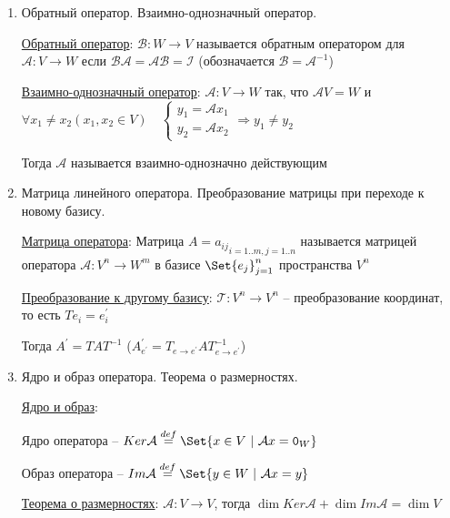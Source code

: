 \documentclass[12pt]{article}
\begin{document}
\begin{enumerate}
        4* $\mathcal{A} (\mathcal{B}\mathcal{C}) = (\mathcal{A}\mathcal{B}) \mathcal{C}$


        \item Обратный оператор. Взаимно-однозначный оператор.

        \hyperlink{reverselinearoperator}{Обратный оператор}: $\mathcal{B} : W \rightarrow V$ называется обратным оператором для $\mathcal{A} : V \rightarrow W$
        если $\mathcal{B}\mathcal{A} = \mathcal{A}\mathcal{B} = \mathcal{I}$ (обозначается $\mathcal{B} = \mathcal{A}^{-1}$)

        \hyperlink{onetoonelinearoperator}{Взаимно-однозначный оператор}: $\mathcal{A} : V \rightarrow W$ так, что $\mathcal{A}V = W$ и $\forall x_1 \neq x_2 (x_1, x_2 \in V) \quad
        \begin{cases}y_1 = \mathcal{A}x_1 \\ y_2 = \mathcal{A}x_2\end{cases} \Longrightarrow y_1 \neq y_2$

        Тогда $\mathcal{A}$ называется взаимно-однозначно действующим

        \item Матрица линейного оператора. Преобразование матрицы при переходе к новому базису.

        \hyperlink{operatorsmatrix}{Матрица оператора}: Матрица $A = {a_{ij}}_{i=1..m, j=1..n}$ называется матрицей оператора $\mathcal{A} : V^n \rightarrow W^m$ в базисе $\Set{e_j}^n_{j=1}$ пространства $V^n$

        \hyperlink{transformationtodifferentbasis}{Преобразование к другому базису}:     $\mathcal{T} : V^n \rightarrow V^n$ -- преобразование координат, то есть $Te_i = e^\prime_i$

        Тогда $A^\prime = TAT^{-1}$ ($A^\prime_{e^\prime} = T_{e\to e^\prime}AT^{-1}_{e\to e^\prime}$)

        \item Ядро и образ оператора. Теорема о размерностях.

        \hyperlink{kernalandimageofoperator}{Ядро и образ}:

        Ядро оператора -- $Ker \mathcal{A} \stackrel{def}{=} \Set{x \in V \ | \ \mathcal{A}x = \texttt{0}_W}$

        Образ оператора -- $Im \mathcal{A} \stackrel{def}{=} \Set{y \in W \ | \ \mathcal{A}x = y}$

        \hyperlink{theoremaboutdimensions}{Теорема о размерностях}: $\mathcal{A} : V \rightarrow V$, тогда $\dim Ker \mathcal{A} + \dim Im \mathcal{A} = \dim V$



\end{enumerate}
\end{document}
